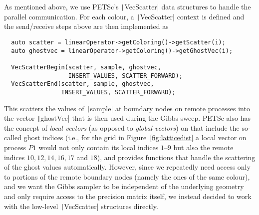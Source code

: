 \documentclass[
fontsize=11pt,
paper=a4,
numbers=noenddot
]{scrartcl}
\begin{document}

As mentioned above, we use PETSc's \texttt|VecScatter| data structures to handle the parallel communication. For each colour, a \texttt|VecScatter| context is defined and the send/receive steps above are then implemented as
\begin{verbatim}
  auto scatter = linearOperator->getColoring()->getScatter(i);
  auto ghostvec = linearOperator->getColoring()->getGhostVec(i);

  VecScatterBegin(scatter, sample, ghostvec, 
                  INSERT_VALUES, SCATTER_FORWARD);
  VecScatterEnd(scatter, sample, ghostvec, 
                INSERT_VALUES, SCATTER_FORWARD);
\end{verbatim}
This scatters the values of \texttt|sample| at boundary nodes on remote processes into the vector \texttt|ghostVec| that is then used during the Gibbs sweep. PETSc also has the concept of \emph{local vectors} (as opposed to \emph{global vectors}) on that include the so-called ghost indices (i.e., for the grid in Figure~\ref{fig:latticedist} a local vector on process $P1$ would not only contain its local indices $1$--$9$ but also the remote indices $10,12,14,16,17$ and $18$), and provides functions that handle the scattering of the ghost values automatically. However, since we repeatedly need access only to portions of the remote boundary nodes (namely the ones of the same colour), and we want the Gibbs sampler to be independent of the underlying geometry and only require access to the precision matrix itself, we instead decided to work with the low-level \texttt|VecScatter| structures directly.
\end{document}
